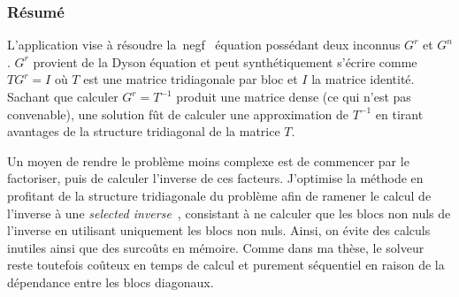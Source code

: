 

\subsubsection*{Résumé}

L'application vise à résoudre la~\gls{negf}~\cite{sch61} équation possédant
deux inconnus $G^r$ et $G^n$. $G^r$ provient de la Dyson équation et peut
synthétiquement s'écrire comme $T G^r = I$ où $T$ est une matrice tridiagonale
par bloc et $I$ la matrice identité. Sachant que calculer $G^r = T^{-1}$
produit une matrice dense (ce qui n'est pas convenable), une solution fût de
calculer une approximation de $T^{-1}$ en tirant avantages de la structure
tridiagonal de la matrice $T$.

Un moyen de rendre le problème moins complexe est de commencer par le
factoriser, puis de calculer l'inverse de ces facteurs. J'optimise la méthode
en profitant de la structure tridiagonale du problème afin de ramener le calcul
de l'inverse à une \textit{selected inverse}~\cite{lyml11}, consistant à ne
calculer que les blocs non nuls de l'inverse en utilisant uniquement les blocs
non nuls. Ainsi, on évite des calculs inutiles ainsi que des surcoûts en
mémoire. Comme dans ma thèse, le solveur reste toutefois coûteux en temps de
calcul et purement séquentiel en raison de la dépendance entre les blocs
diagonaux.


